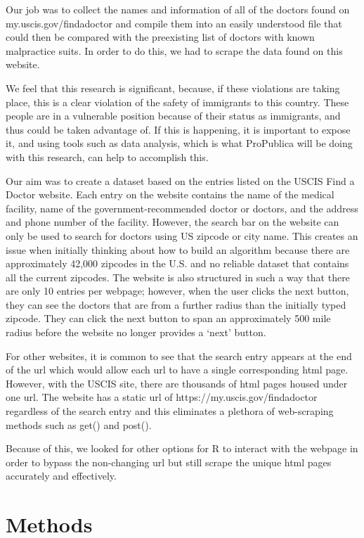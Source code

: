 \documentclass[10pt,letterpaper]{article}
\begin{document}
Our job was to collect the names and information of all of the doctors
found on my.uscis.gov/findadoctor and compile them into an easily
understood file that could then be compared with the preexisting list of
doctors with known malpractice suits. In order to do this, we had to
scrape the data found on this website.

We feel that this research is significant, because, if these violations
are taking place, this is a clear violation of the safety of immigrants
to this country. These people are in a vulnerable position because of
their status as immigrants, and thus could be taken advantage of. If
this is happening, it is important to expose it, and using tools such as
data analysis, which is what ProPublica will be doing with this
research, can help to accomplish this.

Our aim was to create a dataset based on the entries listed on the USCIS
Find a Doctor website. Each entry on the website contains the name of
the medical facility, name of the government-recommended doctor or
doctors, and the address and phone number of the facility. However, the
search bar on the website can only be used to search for doctors using
US zipcode or city name. This creates an issue when initially thinking
about how to build an algorithm because there are approximately 42,000
zipcodes in the U.S. and no reliable dataset that contains all the
current zipcodes. The website is also structured in such a way that
there are only 10 entries per webpage; however, when the user clicks the
next button, they can see the doctors that are from a further radius
than the initially typed zipcode. They can click the next button to span
an approximately 500 mile radius before the website no longer provides a
`next' button.

For other websites, it is common to see that the search entry appears at
the end of the url which would allow each url to have a single
corresponding html page. However, with the USCIS site, there are
thousands of html pages housed under one url. The website has a static
url of https://my.uscis.gov/findadoctor regardless of the search entry
and this eliminates a plethora of web-scraping methods such as get() and
post().

Because of this, we looked for other options for R to interact with the
webpage in order to bypass the non-changing url but still scrape the
unique html pages accurately and effectively.

\section{Methods}\label{methods}
\end{document}
